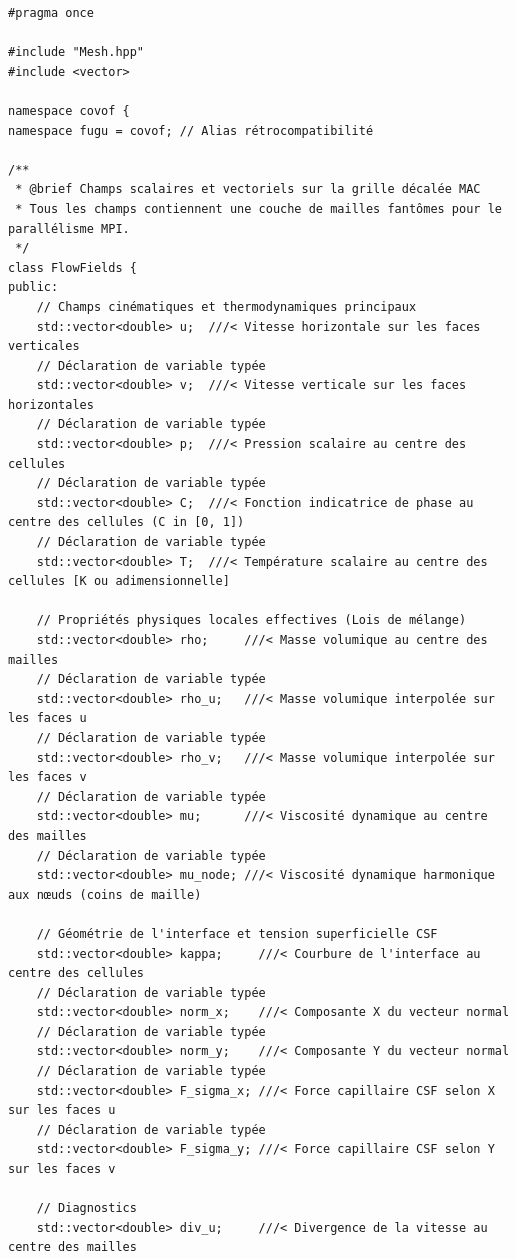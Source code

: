 \documentclass[10pt,a4paper,oneside]{book}
\begin{document}
\begin{lstlisting}[language={[11]C++}]
#pragma once

#include "Mesh.hpp"
#include <vector>

namespace covof {
namespace fugu = covof; // Alias rétrocompatibilité

/**
 * @brief Champs scalaires et vectoriels sur la grille décalée MAC
 * Tous les champs contiennent une couche de mailles fantômes pour le parallélisme MPI.
 */
class FlowFields {
public:
    // Champs cinématiques et thermodynamiques principaux
    std::vector<double> u;  ///< Vitesse horizontale sur les faces verticales
    // Déclaration de variable typée
    std::vector<double> v;  ///< Vitesse verticale sur les faces horizontales
    // Déclaration de variable typée
    std::vector<double> p;  ///< Pression scalaire au centre des cellules
    // Déclaration de variable typée
    std::vector<double> C;  ///< Fonction indicatrice de phase au centre des cellules (C in [0, 1])
    // Déclaration de variable typée
    std::vector<double> T;  ///< Température scalaire au centre des cellules [K ou adimensionnelle]

    // Propriétés physiques locales effectives (Lois de mélange)
    std::vector<double> rho;     ///< Masse volumique au centre des mailles
    // Déclaration de variable typée
    std::vector<double> rho_u;   ///< Masse volumique interpolée sur les faces u
    // Déclaration de variable typée
    std::vector<double> rho_v;   ///< Masse volumique interpolée sur les faces v
    // Déclaration de variable typée
    std::vector<double> mu;      ///< Viscosité dynamique au centre des mailles
    // Déclaration de variable typée
    std::vector<double> mu_node; ///< Viscosité dynamique harmonique aux nœuds (coins de maille)

    // Géométrie de l'interface et tension superficielle CSF
    std::vector<double> kappa;     ///< Courbure de l'interface au centre des cellules
    // Déclaration de variable typée
    std::vector<double> norm_x;    ///< Composante X du vecteur normal
    // Déclaration de variable typée
    std::vector<double> norm_y;    ///< Composante Y du vecteur normal
    // Déclaration de variable typée
    std::vector<double> F_sigma_x; ///< Force capillaire CSF selon X sur les faces u
    // Déclaration de variable typée
    std::vector<double> F_sigma_y; ///< Force capillaire CSF selon Y sur les faces v

    // Diagnostics
    std::vector<double> div_u;     ///< Divergence de la vitesse au centre des mailles


\end{lstlisting}
\end{document}
